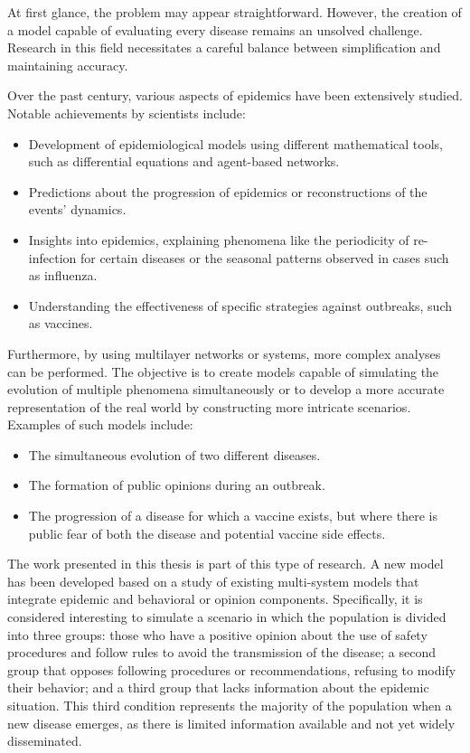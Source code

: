 At first glance, the problem may appear straightforward. However, the creation of a model capable of evaluating every disease remains an unsolved challenge. Research in this field necessitates a careful balance between simplification and maintaining accuracy.

Over the past century, various aspects of epidemics have been extensively studied. Notable achievements by scientists include:
\begin{itemize}
	\item Development of epidemiological models using different mathematical tools, such as differential equations and agent-based networks.
	\item Predictions about the progression of epidemics or reconstructions of the events' dynamics.
	\item Insights into epidemics, explaining phenomena like the periodicity of re-infection for certain diseases or the seasonal patterns observed in cases such as influenza.
	\item Understanding the effectiveness of specific strategies against outbreaks, such as vaccines.
\end{itemize}
Furthermore, by using multilayer networks or systems, more complex analyses can be performed. The objective is to create models capable of simulating the evolution of multiple phenomena simultaneously or to develop a more accurate representation of the real world by constructing more intricate scenarios. Examples of such models include:
\begin{itemize}
	\item The simultaneous evolution of two different diseases.
	\item The formation of public opinions during an outbreak.
	\item The progression of a disease for which a vaccine exists, but where there is public fear of both the disease and potential vaccine side effects.
\end{itemize}
The work presented in this thesis is part of this type of research. A new model has been developed based on a study of existing multi-system models that integrate epidemic and behavioral or opinion components. Specifically, it is considered interesting to simulate a scenario in which the population is divided into three groups: those who have a positive opinion about the use of safety procedures and follow rules to avoid the transmission of the disease; a second group that opposes following procedures or recommendations, refusing to modify their behavior; and a third group that lacks information about the epidemic situation. This third condition represents the majority of the population when a new disease emerges, as there is limited information available and not yet widely disseminated.
